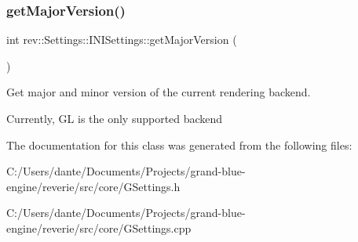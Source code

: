 \subsubsection{\texorpdfstring{getMajorVersion()}{getMajorVersion()}}
{\footnotesize\ttfamily int rev\+::\+Settings\+::\+I\+N\+I\+Settings\+::get\+Major\+Version (\begin{DoxyParamCaption}{ }\end{DoxyParamCaption})}



Get major and minor version of the current rendering backend. 

Currently, GL is the only supported backend 

The documentation for this class was generated from the following files\+:\begin{DoxyCompactItemize}
\item 
C\+:/\+Users/dante/\+Documents/\+Projects/grand-\/blue-\/engine/reverie/src/core/G\+Settings.\+h\item 
C\+:/\+Users/dante/\+Documents/\+Projects/grand-\/blue-\/engine/reverie/src/core/G\+Settings.\+cpp\end{DoxyCompactItemize}
